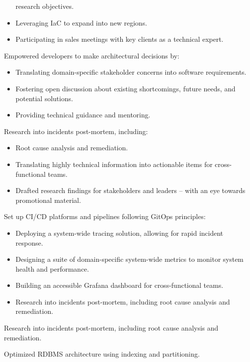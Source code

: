 \begin{jobReflectizLead}
\begin{itemize}
      research objectives.
    \item Leveraging IaC to expand into new regions.
    \item Participating in sales meetings with key clients as a
      technical expert.
  \end{itemize}
\item Empowered developers to make architectural decisions by:
  \begin{itemize}
    \item Translating domain-specific stakeholder concerns into
      software requirements.
    \item Fostering open discussion about existing shortcomings,
      future needs, and potential solutions.
    \item Providing technical guidance and mentoring.
  \end{itemize}
\item Research into incidents post-mortem, including:
  \begin{itemize}
    \item Root cause analysis and remediation.
    \item Translating highly technical information into actionable
      items for cross-functional teams.
    \item Drafted research findings for stakeholders and leaders --
      with an eye towards promotional material.
  \end{itemize}
\item Set up CI/CD platforms and pipelines following GitOps principles:
  \begin{itemize}
    \item Deploying a system-wide tracing solution, allowing for
      rapid incident response.
    \item Designing a suite of domain-specific system-wide metrics
      to monitor system health and performance.
    \item Building an accessible Grafana dashboard for cross-functional teams.
    \item Research into incidents post-mortem, including root cause
      analysis and remediation.
  \end{itemize}
\item Research into incidents post-mortem, including root cause
  analysis and remediation.
\item Optimized RDBMS architecture using indexing and partitioning.
\end{jobReflectizLead}

